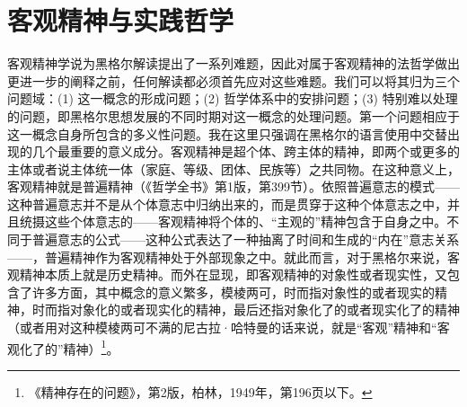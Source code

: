 \chapter{客观精神与实践哲学}

客观精神学说为黑格尔解读提出了一系列难题，因此对属于客观精神的法哲学做出更进一步的阐释之前，任何解读都必须首先应对这些难题。我们可以将其归为三个问题域：(1) 这一概念的形成问题；(2) 哲学体系中的安排问题；(3) 特别难以处理的问题，即黑格尔思想发展的不同时期对这一概念的处理问题。第一个问题相应于这一概念自身所包含的多义性问题。我在这里只强调在黑格尔的语言使用中交替出现的几个最重要的意义成分。客观精神是超个体、跨主体的精神，即两个或更多的主体或者说主体统一体（家庭、等级、团体、民族等）之共同物。在这种意义上，客观精神就是普遍精神（《哲学全书》第1版，第399节）。依照普遍意志的模式——这种普遍意志并不是从个体意志中归纳出来的，而是贯穿于这种个体意志之中，并且统摄这些个体意志的——客观精神将个体的、“主观的”精神包含于自身之中。不同于普遍意志的公式——这种公式表达了一种抽离了时间和生成的“内在”意志关系——，普遍精神作为客观精神处于外部现象之中。就此而言，对于黑格尔来说，客观精神本质上就是历史精神。而外在显现，即客观精神的对象性或者现实性，又包含了许多方面，其中概念的意义繁多，模棱两可，时而指对象性的或者现实的精神，时而指对象化的或者现实化的精神，最后还指对象化了的或者现实化了的精神（或者用对这种模棱两可不满的尼古拉·哈特曼的话来说，就是“客观”精神和“客观化了的”精神）\footnote{《精神存在的问题》，第2版，柏林，1949年，第196页以下。}。

